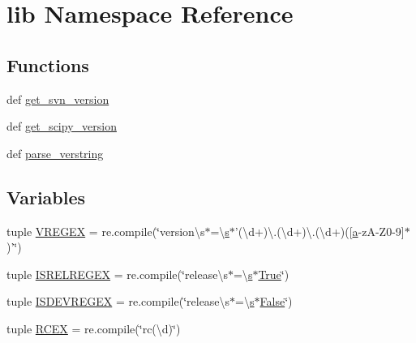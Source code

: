 \hypertarget{namespacelib}{}\section{lib Namespace Reference}
\label{namespacelib}
\subsection*{Functions}
\begin{DoxyCompactItemize}
\item 
def \hyperlink{namespacelib_ad295006050b4e84066029682a8e4b813}{get\+\_\+svn\+\_\+version}
\item 
def \hyperlink{namespacelib_af25db24287e585e8919da2ef80975e47}{get\+\_\+scipy\+\_\+version}
\item 
def \hyperlink{namespacelib_a3b3ab663f4466326f55749c258d7812f}{parse\+\_\+verstring}
\end{DoxyCompactItemize}
\subsection*{Variables}
\begin{DoxyCompactItemize}
\item 
tuple \hyperlink{namespacelib_a2c71642ed6dc1f3731c2a25f5b143a14}{V\+R\+E\+G\+E\+X} = re.\+compile(\char`\"{}version\textbackslash{}s$\ast$=\textbackslash{}\hyperlink{indexexpr_8h_ae024b0db549122b44c349ae28ec990dc}{s}$\ast$'(\textbackslash{}d+)\textbackslash{}.(\textbackslash{}d+)\textbackslash{}.(\textbackslash{}d+)(\mbox{[}\hyperlink{gen__mat5files_8m_aae328bf20413f220e38aec4d95bfd6da}{a}-\/z\+A-\/Z0-\/9\mbox{]}$\ast$)'\char`\"{})
\item 
tuple \hyperlink{namespacelib_a1ebdd670633bcea771e3c27bfac0623a}{I\+S\+R\+E\+L\+R\+E\+G\+E\+X} = re.\+compile(\char`\"{}release\textbackslash{}s$\ast$=\textbackslash{}\hyperlink{indexexpr_8h_ae024b0db549122b44c349ae28ec990dc}{s}$\ast$\hyperlink{libqhull_8h_add3ca9eefe3b5b754426f51d3043e579}{True}\char`\"{})
\item 
tuple \hyperlink{namespacelib_ad1b6fc30ae38674bf21b2cbb2c2db25b}{I\+S\+D\+E\+V\+R\+E\+G\+E\+X} = re.\+compile(\char`\"{}release\textbackslash{}s$\ast$=\textbackslash{}\hyperlink{indexexpr_8h_ae024b0db549122b44c349ae28ec990dc}{s}$\ast$\hyperlink{libqhull_8h_a306ebd41c0cd1303b1372c6153f0caf8}{False}\char`\"{})
\item 
tuple \hyperlink{namespacelib_a3b631e15e3971a05778799b2e97ca0a8}{R\+C\+E\+X} = re.\+compile(\char`\"{}rc(\textbackslash{}d)\char`\"{})
\end{DoxyCompactItemize}


